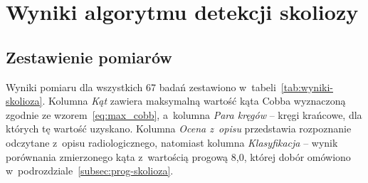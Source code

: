 \section{Wyniki algorytmu detekcji skoliozy}
\label{sec:wyniki-skolioza}

\subsection{Zestawienie pomiarów}
\label{subsec:zestawienie-skolioza}

Wyniki pomiaru dla wszystkich 67 badań zestawiono w~tabeli~\ref{tab:wyniki-skolioza}.
Kolumna \textit{Kąt} zawiera maksymalną wartość kąta Cobba wyznaczoną zgodnie ze wzorem~\ref{eq:max_cobb}, a~kolumna \textit{Para kręgów} -- kręgi krańcowe, dla których tę wartość uzyskano.
Kolumna \textit{Ocena z~opisu} przedstawia rozpoznanie odczytane z~opisu radiologicznego, natomiast kolumna \textit{Klasyfikacja} -- wynik porównania zmierzonego kąta z~wartością progową 8,0\degree{}, której dobór omówiono w~podrozdziale~\ref{subsec:prog-skolioza}.


